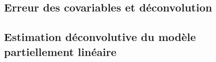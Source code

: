 {

    
    
    \subsection{Erreur des covariables et déconvolution}
    {
        
    }
    \subsection{Estimation déconvolutive du modèle partiellement linéaire}
    {
        
    }
}
